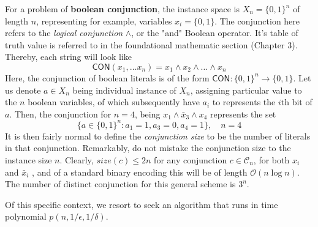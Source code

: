 For a problem of \textbf{boolean conjunction}, the instance space is $X_{n}=\{0,1\}^{n}$ of length $n$, representing for example, variables $x_{i}=\{0,1\}$. The conjunction here refers to the \textit{logical conjunction} $\land$, or the "and" Boolean operator. It's table of truth value is referred to in the foundational mathematic section (Chapter 3). Thereby, each string will look like 
\begin{equation}
    \mathsf{CON}(x_{1},\dots x_{n}) = x_{1}\land x_{2} \land \dots \land x_{n}
\end{equation} 
Here, the conjunction of boolean literals is of the form $\mathsf{CON}:\{0,1\}^{n}\to \{0,1\}$. Let us denote $a\in X_{n}$ being individual instance of $X_{n}$, assigning particular value to the $n$ boolean variables, of which subsequently have $a_{i}$ to represents the $i$th bit of $a$. Then, the conjunction for $n=4$, being $x_{1}\land \bar{x}_{3} \land x_{4}$ represents the set \begin{equation}
    \{a\in \{0,1\}^{n} : a_{1} = 1, a_{3} = 0, a_{4} = 1 \}, \quad n=4
\end{equation}
It is then fairly normal to define the \textit{conjunction size} to be the number of literals in that conjunction. Remarkably, do not mistake the conjunction size to the instance size $n$. Clearly, $size(c)\leq 2n$ for any conjunction $c\in \mathcal{C}_{n}$, for both $x_{i}$ and $\bar{x}_{i}$ , and of a standard binary encoding this will be of length $\mathcal{O}(n\log{n})$. The number of distinct conjunction for this general scheme is $3^{n}$. 

Of this specific context, we resort to seek an algorithm that runs in time polynomial $p(n,1/\epsilon,1/\delta)$. 

